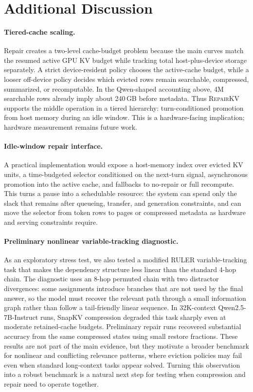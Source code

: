 \documentclass{article}
\newcommand{\repairkv}{\textsc{RepairKV}}
\begin{document}
\section{Additional Discussion}
\label{app:additional-discussion}

\paragraph{Tiered-cache scaling.}
Repair creates a two-level cache-budget problem because the main curves match
the resumed active GPU KV budget while tracking total host-plus-device
storage separately.
A strict device-resident policy chooses the active-cache budget, while a
looser off-device policy decides which evicted rows remain searchable,
compressed, summarized, or recomputable.
In the Qwen-shaped accounting
above, 4M searchable rows already imply about 240\,GB before metadata.
Thus \repairkv{} supports the middle operation in a tiered hierarchy:
turn-conditioned promotion from host memory during an idle window.
This is a hardware-facing implication; hardware measurement remains
future work.

\paragraph{Idle-window repair interface.}
A practical implementation would expose a host-memory index over evicted KV
units, a time-budgeted selector conditioned on the next-turn signal,
asynchronous promotion into the active cache, and fallbacks to no-repair or
full recompute.
This turns a pause into a schedulable resource: the system can spend only
the slack that remains after queueing, transfer, and generation
constraints, and can move the selector from token rows to pages or
compressed metadata as hardware and serving constraints require.

\paragraph{Preliminary nonlinear variable-tracking diagnostic.}
\label{app:vt8hop-div2}
As an exploratory stress test, we also tested a modified RULER
variable-tracking task that makes the dependency structure less linear than the
standard 4-hop chain. The diagnostic uses an 8-hop permuted chain with two
distractor divergences: some assignments introduce branches that are not used by
the final answer, so the model must recover the relevant path through a small
information graph rather than follow a tail-friendly linear sequence. In
32K-context Qwen2.5-7B-Instruct runs, SnapKV compression degraded this task
sharply even at moderate retained-cache budgets. Preliminary repair runs
recovered substantial accuracy from the same compressed states using small
restore fractions. These results are not part of the main evidence, but they
motivate a broader benchmark for nonlinear and conflicting relevance patterns,
where eviction policies may fail even when standard long-context tasks appear
solved. Turning this observation into a robust benchmark is a natural next step
for testing when compression and repair need to operate together.
\end{document}
